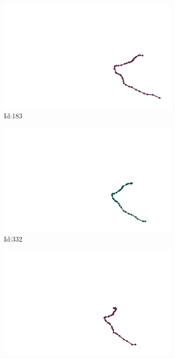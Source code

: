\documentclass[12pt,twoside]{report}
\begin{document}
\begin{figure}
\centering
\begin{subfigure}[b]{0.20\textwidth}
\centering
\includegraphics[width=\textwidth]{../../trajectories/183.png}
\caption{Id:183}
\end{subfigure}
\begin{subfigure}[b]{0.20\textwidth}
\centering
\includegraphics[width=\textwidth]{../../trajectories/332.png}
\caption{Id:332}
\end{subfigure}
\begin{subfigure}[b]{0.20\textwidth}
\centering
\includegraphics[width=\textwidth]{../../trajectories/641.png}

\end{subfigure}
\end{figure}
\end{document}
